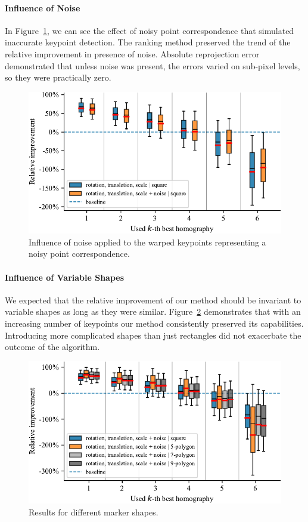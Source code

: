 \paragraph{Influence of Noise}
In Figure~\ref{fig:NoiseInfluence}, we can see the effect of noisy point correspondence that simulated inaccurate keypoint detection. The ranking method preserved the trend of the relative improvement in presence of noise. Absolute reprojection error demonstrated that unless noise was present, the errors varied on sub-pixel levels, so they were practically zero.

\begin{figure}[t]
    \centering
    \includegraphics[width=\boxplotimgwidth]{figures/homography/noise_influence.pdf}
    \caption{Influence of noise applied to the warped keypoints representing a noisy point correspondence.}
    \label{fig:NoiseInfluence}
\end{figure}

\paragraph{Influence of Variable Shapes}
We expected that the relative improvement of our method should be invariant to variable shapes as long as they were similar. Figure~\ref{fig:ShapeInfluence} demonstrates that with an increasing number of keypoints our method consistently preserved its capabilities. Introducing more complicated shapes than just rectangles did not exacerbate the outcome of the algorithm.

\begin{figure}[t]
    \centering
    \includegraphics[width=\boxplotimgwidth]{figures/homography/shape_influence.pdf}
    \caption{Results for different marker shapes.}
    \label{fig:ShapeInfluence}
\end{figure}

